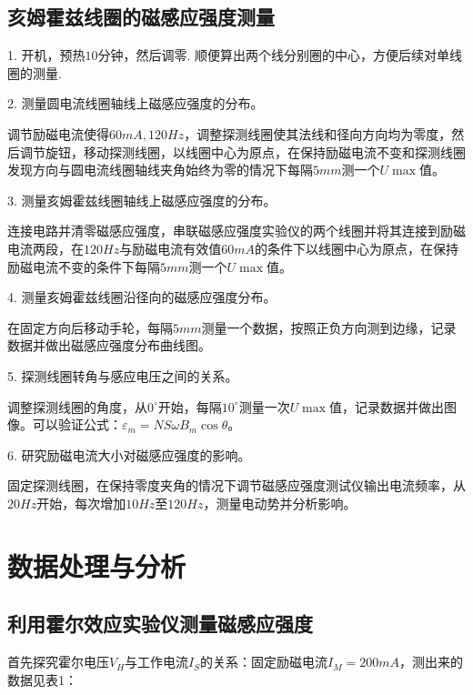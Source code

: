 \documentclass[11pt]{article}
\begin{document}
\subsection{亥姆霍兹线圈的磁感应强度测量}

1. 开机，预热$10$分钟，然后调零. 顺便算出两个线分别圈的中心，方便后续对单线圈的测量.

2. 测量圆电流线圈轴线上磁感应强度的分布。

调节励磁电流使得$60mA,120Hz$，调整探测线圈使其法线和径向方向均为零度，然后调节旋钮，移动探测线圈，以线圈中心为原点，在保持励磁电流不变和探测线圈发现方向与圆电流线圈轴线夹角始终为零的情况下每隔$5mm$测一个$U\max$值。

3. 测量亥姆霍兹线圈轴线上磁感应强度的分布。

连接电路并清零磁感应强度，串联磁感应强度实验仪的两个线圈并将其连接到励磁电流两段，在$120Hz$与励磁电流有效值$60mA$的条件下以线圈中心为原点，在保持励磁电流不变的条件下每隔$5mm$测一个$U\max$值。

4. 测量亥姆霍兹线圈沿径向的磁感应强度分布。

在固定方向后移动手轮，每隔$5mm$测量一个数据，按照正负方向测到边缘，记录数据并做出磁感应强度分布曲线图。

5. 探测线圈转角与感应电压之间的关系。

调整探测线圈的角度，从$0^\circ$开始，每隔$10^\circ$测量一次$U\max$值，记录数据并做出图像。可以验证公式：$\varepsilon_m=NS\omega B_m\cos \theta$。

6. 研究励磁电流大小对磁感应强度的影响。

固定探测线圈，在保持零度夹角的情况下调节磁感应强度测试仪输出电流频率，从$20Hz$开始，每次增加$10Hz$至$120Hz$，测量电动势并分析影响。

\section{数据处理与分析}

\subsection{利用霍尔效应实验仪测量磁感应强度}

首先探究霍尔电压$V_H$与工作电流$I_S$的关系：固定励磁电流$I_M=200mA$，测出来的数据见表1：
\end{document}
